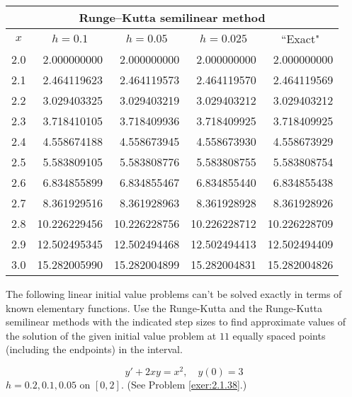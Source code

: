 \documentclass{ximera}
\begin{document}
\begin{problem}
\begin{solution}
{\small
\begin{tabular}{|c|r|r|r|r|}
\hline
\multicolumn{5}{|c|}{Runge--Kutta semilinear method}\\\hline
\multicolumn{1}{|c|}{$x$}&
\multicolumn{1}{|c|}{$h=0.1$}&
\multicolumn{1}{|c|}{$h=0.05$}&
\multicolumn{1}{|c|}{$h=0.025$}&
\multicolumn{1}{|c|}{``Exact"}\\ \hline
2.0 &  2.000000000 &  2.000000000 &  2.000000000 &  2.000000000 \\
2.1 &  2.464119623 &  2.464119573 &  2.464119570 &  2.464119569 \\
2.2 &  3.029403325 &  3.029403219 &  3.029403212 &  3.029403212 \\
2.3 &  3.718410105 &  3.718409936 &  3.718409925 &  3.718409925 \\
2.4 &  4.558674188 &  4.558673945 &  4.558673930 &  4.558673929 \\
2.5 &  5.583809105 &  5.583808776 &  5.583808755 &  5.583808754 \\
2.6 &  6.834855899 &  6.834855467 &  6.834855440 &  6.834855438 \\
2.7 &  8.361929516 &  8.361928963 &  8.361928928 &  8.361928926 \\
2.8 & 10.226229456 & 10.226228756 & 10.226228712 & 10.226228709 \\
2.9 & 12.502495345 & 12.502494468 & 12.502494413 & 12.502494409 \\
3.0 & 15.282005990 & 15.282004899 & 15.282004831 & 15.282004826 \\
\hline
\end{tabular}}
\end{solution}
    
\end{problem}

\begin{problem}\label{exer:3.3.15} The following linear initial value problems can't be solved exactly in terms of known elementary functions. Use the Runge-Kutta and the Runge-Kutta semilinear methods with the
indicated step sizes to find approximate values of the solution of the given initial value problem at $11$ equally spaced points (including the endpoints) in the interval.

$$y'+2xy=x^2,\quad y(0)=3$$
$h=0.2,0.1,0.05$ on $[0,2]$.
(See Problem \ref{exer:2.1.38}.)
\end{problem}
\end{document}
